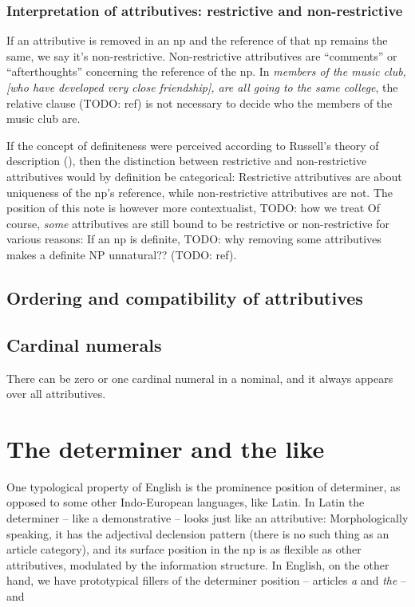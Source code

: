\documentclass[UTF8, a4paper, oneside, scheme=plain]{ctexrep}
\newcommand{\corpus}[1]{\emph{#1}}
\begin{document}
\subsubsection{Interpretation of attributives: restrictive and non-restrictive}

If an attributive is removed in an \acs{np} 
and the reference of that \acs{np} remains the same,
we say it's non-restrictive.
Non-restrictive attributives are ``comments'' or ``afterthoughts'' concerning the reference of the \acs{np}.
In \corpus{members of the music club, 
[who have developed very close friendship], 
are all going to the same college},
the relative clause (TODO: ref) is not necessary to decide who the members of the music club are.

If the concept of definiteness were perceived according to Russell's theory of description 
(),
then the distinction between restrictive and non-restrictive attributives 
would by definition be categorical:
Restrictive attributives are about uniqueness of the \acs{np}'s reference,
while non-restrictive attributives are not.
The position of this note is however more contextualist,
TODO: how we treat 
Of course, \emph{some} attributives are still bound to be restrictive 
or non-restrictive for various reasons:
If an \acs{np} is definite, 
TODO: why removing some attributives makes a definite NP unnatural??
(TODO: ref).

\subsection{Ordering and compatibility of attributives}

\subsection{Cardinal numerals}

There can be zero or one cardinal numeral in a nominal,
and it always appears over all attributives.

\begin{exe}
    \ex 
\end{exe}

\section{The determiner and the like}\label{sec:np.det}

One typological property of English is 
the prominence position of determiner,
as opposed to some other Indo-European languages, like Latin.
In Latin the determiner -- like a demonstrative -- 
looks just like an attributive:
Morphologically speaking, it has the adjectival declension pattern
(there is no such thing as an article category),
and its surface position in the \acs{np} 
is as flexible as other attributives,
modulated by the information structure.
In English, on the other hand, we have prototypical fillers of the determiner position
-- articles \corpus{a} and \corpus{the} -- 
and 
\end{document}

